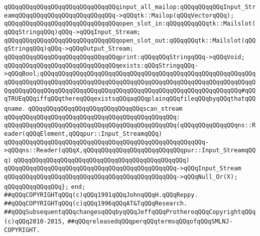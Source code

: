 \verb|qQQqqQQqqQQqqQQqqQQqqQQqqQQqqQQqinput_all_mailop:qQQqqQQqqQQqInput_StreamqQQqqQQqqQQqqQQqqQQqqQQqqQQq->qQQqtk::Mailop(qQQqVectorqQQq);|\newline
\newline
\verb|qQQqqQQqqQQqqQQqqQQqqQQqqQQqqQQqopen_slot_in:qQQqqQQqqQQqtk::Mailslot(qQQqStringqQQq)qQQq->qQQqInput_Stream;|\newline
\verb|qQQqqQQqqQQqqQQqqQQqqQQqqQQqqQQqopen_slot_out:qQQqqQQqtk::Mailslot(qQQqStringqQQq)qQQq->qQQqOutput_Stream;|\newline
\newline
\verb|qQQqqQQqqQQqqQQqqQQqqQQqqQQqqQQqprint:qQQqqQQqStringqQQq->qQQqVoid;|\newline
\newline
\verb|qQQqqQQqqQQqqQQqqQQqqQQqqQQqqQQqexists:qQQqStringqQQq->qQQqBool;qQQqqQQqqQQqqQQqqQQqqQQqqQQqqQQqqQQqqQQqqQQqqQQqqQQqqQQqqQQqqQQqqQQqqQQqqQQqqQQqqQQqqQQqqQQqqQQqqQQqqQQqqQQqqQQqqQQqqQQqqQQqqQQqqQQqqQQqqQQqqQQqqQQqqQQqqQQqqQQqqQQqqQQqqQQqqQQqqQQqqQQqqQQqqQQqqQQq#qQQqTRUEqQQqiffqQQqthereqQQqexistsqQQqaqQQqplainqQQqfileqQQqbyqQQqthatqQQqname.|\newline
\newline
\verb|qQQqqQQqqQQqqQQqqQQqqQQqqQQqqQQqscan_stream|\newline
\verb|qQQqqQQqqQQqqQQqqQQqqQQqqQQqqQQqqQQqqQQqqQQqqQQq:|\newline
\verb|qQQqqQQqqQQqqQQqqQQqqQQqqQQqqQQqqQQqqQQqqQQqqQQq(qQQqqQQqqQQqqQQqns::Reader(qQQqElement,qQQqpur::Input_StreamqQQq)|\newline
\verb|qQQqqQQqqQQqqQQqqQQqqQQqqQQqqQQqqQQqqQQqqQQqqQQqqQQqqQQq->qQQqns::Reader(qQQqX,qQQqqQQqqQQqqQQqqQQqqQQqqQQqpur::Input_StreamqQQq)|\newline
\verb|qQQqqQQqqQQqqQQqqQQqqQQqqQQqqQQqqQQqqQQqqQQqqQQq)|\newline
\verb|qQQqqQQqqQQqqQQqqQQqqQQqqQQqqQQqqQQqqQQqqQQqqQQq->qQQqInput_Stream|\newline
\verb|qQQqqQQqqQQqqQQqqQQqqQQqqQQqqQQqqQQqqQQqqQQqqQQq->qQQqNull_Or(X);|\newline
\newline
\verb|qQQqqQQqqQQqqQQq};|\newline
\verb|end;|\newline
\newline
\verb|##qQQqCOPYRIGHTqQQq(c)qQQq1991qQQqJohnqQQqH.qQQqReppy.|\newline
\verb|##qQQqCOPYRIGHTqQQq(c)qQQq1996qQQqAT&TqQQqResearch.|\newline
\verb|##qQQqSubsequentqQQqchangesqQQqbyqQQqJeffqQQqProtheroqQQqCopyrightqQQq(c)qQQq2010-2015,|\newline
\verb|##qQQqreleasedqQQqperqQQqtermsqQQqofqQQqSMLNJ-COPYRIGHT.|\newline

